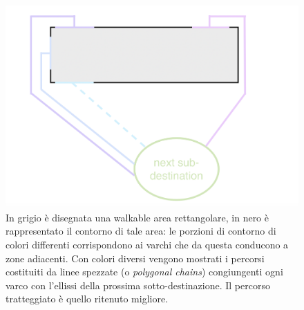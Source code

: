 \documentclass[12pt,a4paper,openright,oneside]{book}
\begin{document}
\begin{figure}
	\centering
	\includegraphics[width=0.8\linewidth]{figures/polygonal-chains-to-subdestination.png}
	\caption{In grigio è disegnata una walkable area rettangolare, in nero è rappresentato il contorno di tale area: le porzioni di contorno di colori differenti corrispondono ai varchi che da questa conducono a zone adiacenti. Con colori diversi vengono mostrati i percorsi costituiti da linee spezzate (o \emph{polygonal chains}) congiungenti ogni varco con l’ellissi della prossima sotto-destinazione. Il percorso tratteggiato è quello ritenuto migliore.}
	\label{fig:polygonal-chains-to-subdestination}
\end{figure}
\end{document}
